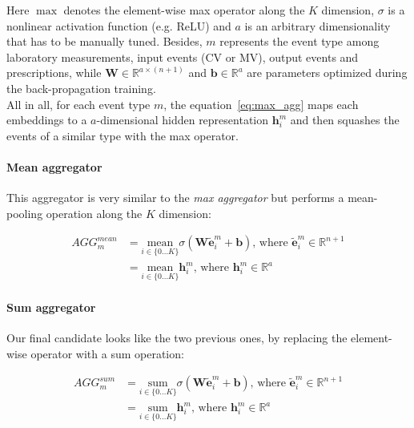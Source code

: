 Here $\max$ denotes the element-wise max operator along the $K$ dimension, $\sigma$ is a nonlinear activation function (e.g. ReLU) and $a$ is an arbitrary dimensionality that has to be manually tuned. Besides, $m$ represents the event type among laboratory measurements, input events (CV or MV), output events and prescriptions, while $\bm{W} \in \mathbb{R}^{a \times (n+1)}$ and $\bm{b} \in \mathbb{R}^a $ are parameters optimized during the back-propagation training. \\

All in all, for each event type $m$, the equation~\ref{eq:max_agg} maps each embeddings to a $a$-dimensional hidden representation $\bm{h}_i^m$ and then squashes the events of a similar type with the max operator.

\paragraph{Mean aggregator} This aggregator is very similar to the \textit{max aggregator} but performs a mean-pooling operation along the $K$ dimension:

\begin{equation}
 \label{eq:max_agg}
 \begin{aligned}
  AGG_m^{mean} 
   &= \underset{i \in \{0 \dots K\}}{\mbox{mean}} \sigma(\bm{W}\bm{\tilde{e}}_i^m + \bm{b})\mbox{, where }\bm{\tilde{e}}_i^m \in \mathbb{R}^{n+1} \\
   &= \underset{i \in \{0 \dots K\}}{\mbox{mean}} \bm{h}_i^m\mbox{, where }\bm{h}_i^m \in \mathbb{R}^{a}
 \end{aligned}
\end{equation}

\paragraph{Sum aggregator} Our final candidate looks like the two previous ones, by replacing the element-wise operator with a sum operation:

\begin{equation}
\label{eq:max_agg}
 \begin{aligned}
 AGG_m^{sum} 
  &= \underset{i \in \{0 \dots K\}}{\mbox{sum}} \sigma(\bm{W}\bm{\tilde{e}}_i^m + \bm{b})\mbox{, where }\bm{\tilde{e}}_i^m \in \mathbb{R}^{n+1} \\
  &= \underset{i \in \{0 \dots K\}}{\mbox{sum}} \bm{h}_i^m\mbox{, where }\bm{h}_i^m \in \mathbb{R}^{a}
 \end{aligned}
\end{equation}


